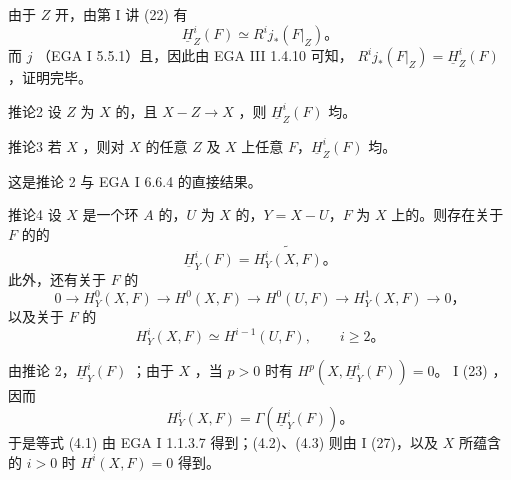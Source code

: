 由于 $Z$ 开，由第 I 讲 (22) 有
\[
\underline H_Z^i(F)\simeq R^ij_*(F|_Z)。
\]
而 $j$ （EGA I 5.5.1）且，因此由 EGA III 1.4.10 可知，
$R^ij_*(F|_Z)=\underline H_Z^i(F)$ ，证明完毕。
\begin{SGAresult}{推论}{2}
设 $Z$ 为 $X$ 的，且 $X-Z\to X$ ，则 $\underline H_Z^i(F)$ 均。
\end{SGAresult}
\begin{SGAresult}{推论}{3}
若 $X$ ，则对 $X$ 的任意 $Z$ 及 $X$ 上任意 $F$，$\underline H_Z^i(F)$ 均。
\end{SGAresult}
这是推论 2 与 EGA I 6.6.4 的直接结果。
\begin{SGAresult}{推论}{4}
设 $X$ 是一个环 $A$ 的，$U$ 为 $X$ 的，$Y=X-U$，$F$ 为 $X$ 上的。则存在关于 $F$ 的的
\[
\underline H_Y^i(F)=\widetilde{H_Y^i(X,F)}。\tag{4.1}
\]
此外，还有关于 $F$ 的
\[
0\longrightarrow H_Y^0(X,F)\longrightarrow H^0(X,F)
\longrightarrow H^0(U,F)\longrightarrow H_Y^1(X,F)\longrightarrow0，\tag{4.2}
\]
以及关于 $F$ 的
\[
H_Y^i(X,F)\simeq H^{i-1}(U,F),\qquad i\ge2。\tag{4.3}
\]
\end{SGAresult}
由推论 2，$\underline H_Y^i(F)$ ；由于 $X$ ，当 $p>0$ 时有 $H^p(X,\underline H_Y^i(F))=0$。 I (23) ，因而
\[
H_Y^i(X,F)=\Gamma(\underline H_Y^i(F))。
\]
于是等式 (4.1) 由 EGA I 1.1.3.7 得到；(4.2)、(4.3) 则由 I (27)，以及 $X$ 所蕴含的 $i>0$ 时 $H^i(X,F)=0$ 得到。

